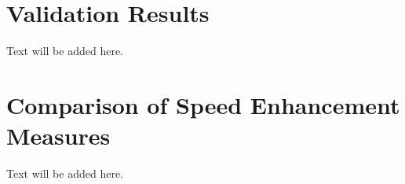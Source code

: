 
\label{sec:results}

\section{Validation Results}
Text will be added here.

\section{Comparison of Speed Enhancement Measures}
Text will be added here.

